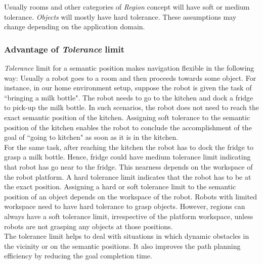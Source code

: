 Usually rooms and other categories of \textit{Region} concept will have soft or medium tolerance.
\textit{Objects} will mostly have hard tolerance.
These assumptions may change depending on the application domain.

\subsubsection{Advantage of \textit{Tolerance} limit} 
\textit{Tolerance} limit for a semantic position makes navigation flexible in the following way:
Usually a robot goes to a room and then proceeds towards some object.
For instance, in our home environment setup, suppose the robot is given the task of ``bringing a milk bottle". The robot needs to go to the
kitchen and dock a fridge to pick-up the milk bottle. In such scenarios, the robot does not need to reach the exact semantic position of the kitchen.
Assigning soft tolerance to the semantic position of the kitchen enables the robot to conclude the accomplishment
of the goal of ``going to kitchen"  as soon as it is in the kitchen.\\

For the same task, after reaching the kitchen the robot has to dock the fridge to grasp a milk bottle. Hence, fridge could have medium tolerance limit indicating
that robot has go near to the fridge. This nearness depends on the workspace of the robot platform. A hard tolerance limit indicates that the robot has to be at the exact position.
Assigning a hard or soft tolerance limit to the semantic position of an object depends on the workspace of the robot. Robots with limited workspace need to
have hard tolerance to grasp objects. However, regions can always have a soft tolerance limit, irrespective of the platform workspace,
unless robots are not grasping any objects at those positions.\\

The tolerance limit helps to deal with situations in which dynamic obstacles in the vicinity or on the semantic positions. 
It also improves the path planning efficiency by reducing the goal completion time.